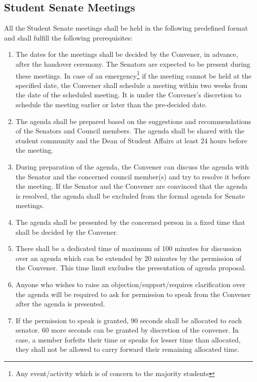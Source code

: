 \documentclass[12pt]{article}
\begin{document}
\subsection{Student Senate Meetings}
All the Student Senate meetings shall be held in the following predefined format and shall fulfill the following prerequisites:
\begin{enumerate}
    \item The dates for the meetings shall be decided by the Convener, in advance, after the handover ceremony.  The Senators are expected to be present during these meetings. In case of an emergency\footnote{Any event/activity which is of concern to the majority students} if the meeting cannot be held at the specified date, the Convener shall schedule a meeting within two weeks from the date of the scheduled meeting. It is under the Convener’s discretion to schedule the meeting earlier or later than the pre-decided date.
    \item The agenda shall be prepared based on the suggestions and recommendations of the Senators and Council members. The agenda shall be shared with the student community and the Dean of Student Affairs at least 24 hours before the meeting.
    \item During preparation of the agenda, the Convener can discuss the agenda with the Senator and the concerned council member(s) and try to resolve it before the meeting. If the Senator and the Convener are convinced that the agenda is resolved, the agenda shall be excluded from the formal agenda for Senate meetings.
    \item The agenda shall be presented by the concerned person in a fixed time that shall be decided by the Convener.
    \item There shall be a dedicated time of maximum of 100 minutes for discussion over an agenda which can be extended by 20  minutes by the permission of the Convener. This time limit excludes the presentation of agenda proposal.
    \item Anyone who wishes to raise an objection/support/requires clarification over the agenda will be required to ask for permission to speak from the Convener after the agenda is presented.
    \item If the permission to speak is granted, 90 seconds shall be allocated to each senator. 60 more seconds can be granted by discretion of the convener. In case, a member forfeits their time or speaks for lesser time than allocated, they shall not be allowed to carry forward their remaining allocated time.

\end{enumerate}
\end{document}
